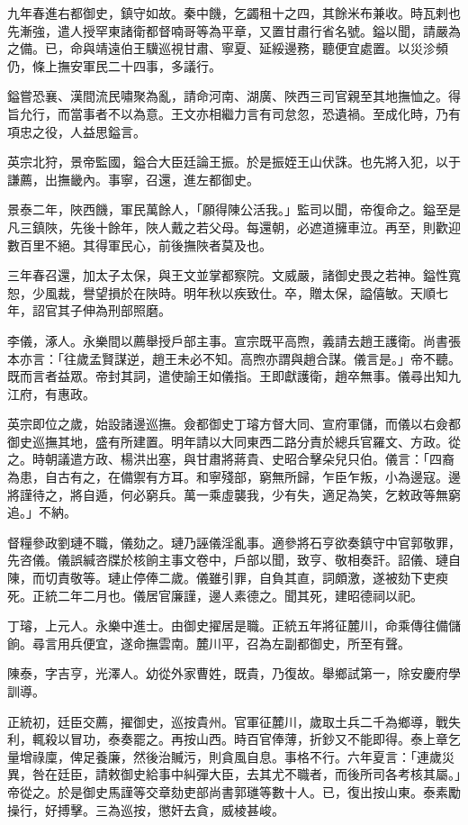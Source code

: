 \begin{pinyinscope}
九年春進右都御史，鎮守如故。秦中饑，乞蠲租十之四，其餘米布兼收。時瓦剌也先漸強，遣人授罕東諸衛都督喃哥等為平章，又置甘肅行省名號。鎰以聞，請嚴為之備。已，命與靖遠伯王驥巡視甘肅、寧夏、延綏邊務，聽便宜處置。以災沴頻仍，條上撫安軍民二十四事，多議行。

鎰嘗恐襄、漢間流民嘯聚為亂，請命河南、湖廣、陜西三司官親至其地撫恤之。得旨允行，而當事者不以為意。王文亦相繼力言有司怠忽，恐遺禍。至成化時，乃有項忠之役，人益思鎰言。

英宗北狩，景帝監國，鎰合大臣廷論王振。於是振姪王山伏誅。也先將入犯，以于謙薦，出撫畿內。事寧，召還，進左都御史。

景泰二年，陜西饑，軍民萬餘人，「願得陳公活我。」監司以聞，帝復命之。鎰至是凡三鎮陜，先後十餘年，陜人戴之若父母。每還朝，必遮道擁車泣。再至，則歡迎數百里不絕。其得軍民心，前後撫陜者莫及也。

三年春召還，加太子太保，與王文並掌都察院。文威嚴，諸御史畏之若神。鎰性寬恕，少風裁，譽望損於在陜時。明年秋以疾致仕。卒，贈太保，謚僖敏。天順七年，詔官其子伸為刑部照磨。

李儀，涿人。永樂間以薦舉授戶部主事。宣宗既平高煦，義請去趙王護衛。尚書張本亦言：「往歲孟賢謀逆，趙王未必不知。高煦亦謂與趙合謀。儀言是。」帝不聽。既而言者益眾。帝封其詞，遣使諭王如儀指。王即獻護衛，趙卒無事。儀尋出知九江府，有惠政。

英宗即位之歲，始設諸邊巡撫。僉都御史丁璿方督大同、宣府軍儲，而儀以右僉都御史巡撫其地，盛有所建置。明年請以大同東西二路分責於總兵官羅文、方政。從之。時朝議遣方政、楊洪出塞，與甘肅將蔣貴、史昭合擊朵兒只伯。儀言：「四裔為患，自古有之，在備禦有方耳。和寧殘部，窮無所歸，乍臣乍叛，小為邊寇。邊將謹待之，將自遁，何必窮兵。萬一乘虛襲我，少有失，適足為笑，乞敕政等無窮追。」不納。

督糧參政劉璉不職，儀劾之。璉乃誣儀淫亂事。適參將石亨欲奏鎮守中官郭敬罪，先咨儀。儀誤緘咨牒於核餉主事文卷中，戶部以聞，致亨、敬相奏訐。詔儀、璉自陳，而切責敬等。璉止停俸二歲。儀雖引罪，自負其直，詞頗激，遂被劾下吏瘐死。正統二年二月也。儀居官廉謹，邊人素德之。聞其死，建昭德祠以祀。

丁璿，上元人。永樂中進士。由御史擢居是職。正統五年將征麓川，命乘傳往備儲餉。尋言用兵便宜，遂命撫雲南。麓川平，召為左副都御史，所至有聲。

陳泰，字吉亨，光澤人。幼從外家曹姓，既貴，乃復故。舉鄉試第一，除安慶府學訓導。

正統初，廷臣交薦，擢御史，巡按貴州。官軍征麓川，歲取土兵二千為鄉導，戰失利，輒殺以冒功，泰奏罷之。再按山西。時百官俸薄，折鈔又不能即得。泰上章乞量增祿廩，俾足養廉，然後治贓污，則貪風自息。事格不行。六年夏言：「連歲災異，咎在廷臣，請敕御史給事中糾彈大臣，去其尤不職者，而後所司各考核其屬。」帝從之。於是御史馬謹等交章劾吏部尚書郭璡等數十人。已，復出按山東。泰素勵操行，好搏擊。三為巡按，懲奸去貪，威棱甚峻。


\end{pinyinscope}
